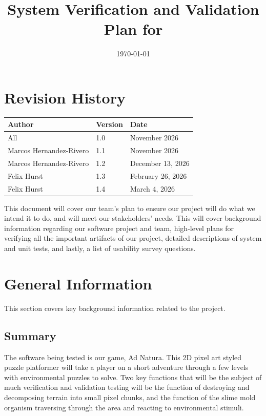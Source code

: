 \documentclass[12pt, titlepage]{article}
\begin{document}
\title{System Verification and Validation Plan for \progname{}} 
\author{\authname}
\date{\today}
	
\maketitle


\section*{Revision History}

\begin{tabularx}{\textwidth}{p{5cm}p{2cm}X}
\toprule {\bf Author} & {\bf Version}& {\bf Date}\\
\midrule
All & 1.0 & November 2026\\
Marcos Hernandez-Rivero & 1.1 & November 2026\\
Marcos Hernandez-Rivero & 1.2 & December 13, 2026\\
Felix Hurst & 1.3 & February 26, 2026\\
Felix Hurst & 1.4 & March 4, 2026\\
\bottomrule
\end{tabularx}

\newpage

\tableofcontents
\newpage
\listoftables
\newpage


This document will cover our team's plan to ensure our project will do what we intend it to do,
and will meet our stakeholders' needs. This will cover background information regarding our
software project and team, high-level plans for verifying all the important artifacts of
our project, detailed descriptions of system and unit tests, and lastly, a list of usability
survey questions.

\section{General Information}

This section covers key background information related to the project.

\subsection{Summary}

The software being tested is our game, Ad Natura. This 2D pixel art styled puzzle platformer will take a player on a short adventure through a few levels with environmental puzzles to solve. Two key functions that will be the subject of much verification and validation testing will be the function of destroying and decomposing terrain into small pixel chunks, and the function of the slime mold organism traversing through the area and reacting to environmental stimuli.
\end{document}
